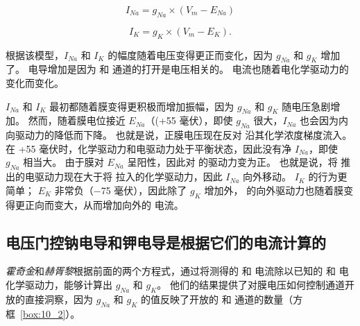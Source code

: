 \begin{equation}
	I_{Na} = g_{Na} \times (V_m - E_{Na})
\end{equation}

\begin{equation}
	I_K = g_K \times (V_m - E_K).
\end{equation}


根据该模型，$I_{Na}$ 和 $I_K$ 的幅度随着电压变得更正而变化，因为 $g_{Na}$ 和 $g_K$ 增加了。
电导增加是因为  和  通道的打开是电压相关的。
电流也随着电化学驱动力的变化而变化。


$I_{Na}$ 和 $I_K$ 最初都随着膜变得更积极而增加振幅，因为 $g_{Na}$ 和 $g_K$ 随电压急剧增加。
然而，随着膜电位接近 $E_{Na}$（(+55 毫伏），即使 $g_{Na}$ 很大，$I_{Na}$ 也会因为内向驱动力的降低而下降。
也就是说，正膜电压现在反对  沿其化学浓度梯度流入。
在 +55 毫伏时，化学驱动力和电驱动力处于平衡状态，因此没有净 $I_{Na}$，即使 $g_{Na}$ 相当大。
由于膜对 $E_{Na}$ 呈阳性，因此对  的驱动力变为正。 
也就是说，将  推出的电驱动力现在大于将  拉入的化学驱动力，因此 $I_{Na}$ 向外移动。
$I_K$ 的行为更简单；
$E_K$ 非常负（−75 毫伏），因此除了 $g_K$ 增加外， 的向外驱动力也随着膜变得更正向而变大，从而增加向外的  电流。



\subsection{电压门控钠电导和钾电导是根据它们的电流计算的}

\textit{霍奇金}和\textit{赫胥黎}根据前面的两个方程式，通过将测得的  和  电流除以已知的  和  电化学驱动力，能够计算出 $g_{Na}$ 和 $g_K$。
他们的结果提供了对膜电压如何控制通道开放的直接洞察，因为 $g_{Na}$ 和 $g_K$ 的值反映了开放的  和  通道的数量（方框~\ref{box:10_2}）。


